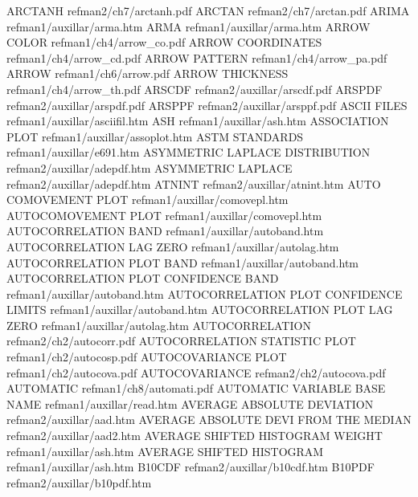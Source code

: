 ARCTANH                                 refman2/ch7/arctanh.pdf
ARCTAN                                  refman2/ch7/arctan.pdf
ARIMA                                   refman1/auxillar/arma.htm
ARMA                                    refman1/auxillar/arma.htm
ARROW COLOR                             refman1/ch4/arrow_co.pdf
ARROW COORDINATES                       refman1/ch4/arrow_cd.pdf
ARROW PATTERN                           refman1/ch4/arrow_pa.pdf
ARROW                                   refman1/ch6/arrow.pdf
ARROW THICKNESS                         refman1/ch4/arrow_th.pdf
ARSCDF                                  refman2/auxillar/arscdf.pdf
ARSPDF                                  refman2/auxillar/arspdf.pdf
ARSPPF                                  refman2/auxillar/arsppf.pdf
ASCII FILES                             refman1/auxillar/asciifil.htm
ASH                                     refman1/auxillar/ash.htm
ASSOCIATION PLOT                        refman1/auxillar/assoplot.htm
ASTM STANDARDS                          refman1/auxillar/e691.htm
ASYMMETRIC LAPLACE DISTRIBUTION         refman2/auxillar/adepdf.htm
ASYMMETRIC LAPLACE                      refman2/auxillar/adepdf.htm
ATNINT                                  refman2/auxillar/atnint.htm
AUTO COMOVEMENT PLOT                    refman1/auxillar/comovepl.htm
AUTOCOMOVEMENT PLOT                     refman1/auxillar/comovepl.htm
AUTOCORRELATION BAND                    refman1/auxillar/autoband.htm
AUTOCORRELATION LAG ZERO                refman1/auxillar/autolag.htm
AUTOCORRELATION PLOT BAND               refman1/auxillar/autoband.htm
AUTOCORRELATION PLOT CONFIDENCE BAND    refman1/auxillar/autoband.htm
AUTOCORRELATION PLOT CONFIDENCE LIMITS  refman1/auxillar/autoband.htm
AUTOCORRELATION PLOT LAG ZERO           refman1/auxillar/autolag.htm
AUTOCORRELATION                         refman2/ch2/autocorr.pdf
AUTOCORRELATION STATISTIC PLOT          refman1/ch2/autocosp.pdf
AUTOCOVARIANCE PLOT                     refman1/ch2/autocova.pdf
AUTOCOVARIANCE                          refman2/ch2/autocova.pdf
AUTOMATIC                               refman1/ch8/automati.pdf
AUTOMATIC VARIABLE BASE NAME            refman1/auxillar/read.htm
AVERAGE ABSOLUTE DEVIATION              refman2/auxillar/aad.htm
AVERAGE ABSOLUTE DEVI FROM THE MEDIAN   refman2/auxillar/aad2.htm
AVERAGE SHIFTED HISTOGRAM WEIGHT        refman1/auxillar/ash.htm
AVERAGE SHIFTED HISTOGRAM               refman1/auxillar/ash.htm
B10CDF                                  refman2/auxillar/b10cdf.htm
B10PDF                                  refman2/auxillar/b10pdf.htm
